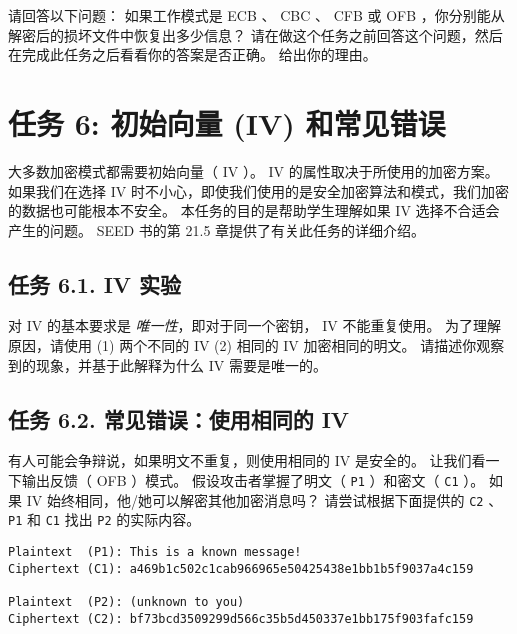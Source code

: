 请回答以下问题：
如果工作模式是 ECB 、 CBC 、 CFB 或 OFB ，你分别能从解密后的损坏文件中恢复出多少信息？
请在做这个任务之前回答这个问题，然后在完成此任务之后看看你的答案是否正确。
给出你的理由。





\section{任务 6: 初始向量 (IV) 和常见错误}

大多数加密模式都需要初始向量（ IV ）。
IV 的属性取决于所使用的加密方案。
如果我们在选择 IV 时不小心，即使我们使用的是安全加密算法和模式，我们加密的数据也可能根本不安全。
本任务的目的是帮助学生理解如果 IV 选择不合适会产生的问题。
SEED 书的第 21.5 章提供了有关此任务的详细介绍。


\subsection{任务 6.1. IV 实验}

对 IV 的基本要求是 \textit{唯一性}，即对于同一个密钥， IV 不能重复使用。
为了理解原因，请使用 (1) 两个不同的 IV (2) 相同的 IV 加密相同的明文。
请描述你观察到的现象，并基于此解释为什么 IV 需要是唯一的。



\subsection{任务 6.2. 常见错误：使用相同的 IV}

有人可能会争辩说，如果明文不重复，则使用相同的 IV 是安全的。
让我们看一下输出反馈（ OFB ）模式。
假设攻击者掌握了明文（ \texttt{P1} ）和密文（ \texttt{C1} ）。
如果 IV 始终相同，他/她可以解密其他加密消息吗？
请尝试根据下面提供的 \texttt{C2} 、 \texttt{P1} 和 \texttt{C1}
找出 \texttt{P2} 的实际内容。


\begin{lstlisting}
Plaintext  (P1): This is a known message!
Ciphertext (C1): a469b1c502c1cab966965e50425438e1bb1b5f9037a4c159

Plaintext  (P2): (unknown to you)
Ciphertext (C2): bf73bcd3509299d566c35b5d450337e1bb175f903fafc159
\end{lstlisting}

